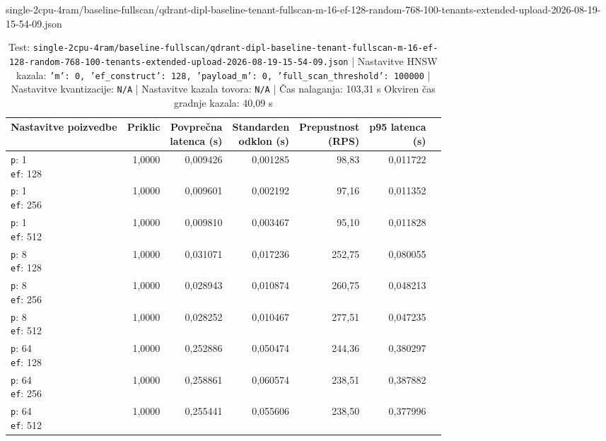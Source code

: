 \begin{table}[htbp]
  \centering
\small
  \caption{single-2cpu-4ram/baseline-fullscan/qdrant-dipl-baseline-tenant-fullscan-m-16-ef-128-random-768-100-tenants-extended-upload-2026-08-19-15-54-09.json}
  \label{tab:single-2cpu-4ram:baseline-fullscan:qdrant-dipl-baseline-tenant-fullscan-m-16-ef-128-random-768-100-tenants-extended-upload-2026-08-19-15-54-09.json}
  \begin{tabularx}{\textwidth}{Xrrrrrr}
    \toprule
    Nastavitve poizvedbe & Priklic & \makecell{Povprečna\\latenca (s)} & \makecell{Standarden\\odklon (s)} & \makecell{Prepustnost\\(RPS)} & \makecell{p95 latenca\\(s)}  \\
    \midrule
    \makecell{\texttt{p}: 1\\\texttt{ef}: 128} & 1,0000 & 0,009426 & 0,001285 & 98,83 & 0,011722 \\
    \makecell{\texttt{p}: 1\\\texttt{ef}: 256} & 1,0000 & 0,009601 & 0,002192 & 97,16 & 0,011352 \\
    \makecell{\texttt{p}: 1\\\texttt{ef}: 512} & 1,0000 & 0,009810 & 0,003467 & 95,10 & 0,011828 \\
    \makecell{\texttt{p}: 8\\\texttt{ef}: 128} & 1,0000 & 0,031071 & 0,017236 & 252,75 & 0,080055 \\
    \makecell{\texttt{p}: 8\\\texttt{ef}: 256} & 1,0000 & 0,028943 & 0,010874 & 260,75 & 0,048213 \\
    \makecell{\texttt{p}: 8\\\texttt{ef}: 512} & 1,0000 & 0,028252 & 0,010467 & 277,51 & 0,047235 \\
    \makecell{\texttt{p}: 64\\\texttt{ef}: 128} & 1,0000 & 0,252886 & 0,050474 & 244,36 & 0,380297 \\
    \makecell{\texttt{p}: 64\\\texttt{ef}: 256} & 1,0000 & 0,258861 & 0,060574 & 238,51 & 0,387882 \\
    \makecell{\texttt{p}: 64\\\texttt{ef}: 512} & 1,0000 & 0,255441 & 0,055606 & 238,50 & 0,377996 \\
    \bottomrule
  \end{tabularx}
\caption* {Test: \texttt{single-2cpu-4ram/baseline-fullscan/qdrant-dipl-baseline-tenant-fullscan-m-16-ef-128-random-768-100-tenants-extended-upload-2026-08-19-15-54-09.json} | Nastavitve HNSW kazala: \texttt{{'m': 0, 'ef\_construct': 128, 'payload\_m': 0, 'full\_scan\_threshold': 100000}} | Nastavitve kvantizacije: \texttt{N/A} | Nastavitve kazala tovora: \texttt{N/A} | Čas nalaganja: 103,31 s Okviren čas gradnje kazala: 40,09 s}\end{table}


